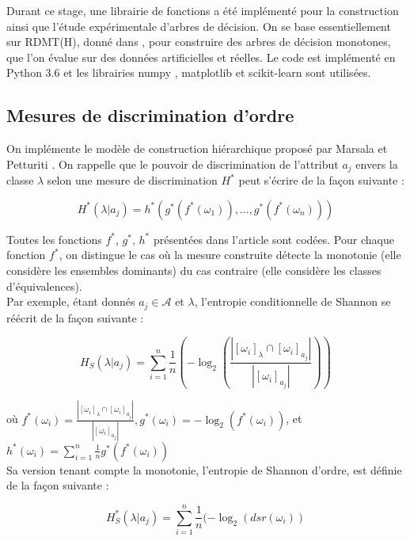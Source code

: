 \documentclass[a4paper]{article}
\begin{document}
Durant ce stage, une librairie de fonctions a été implémenté pour la construction
ainsi que l'étude expérimentale d'arbres de décision.  On se base
essentiellement sur RDMT(H), donné dans \cite{marsala-rank}, pour construire des
arbres de décision monotones, que l'on évalue sur des données artificielles et
réelles. Le code est implémenté en Python 3.6 et les librairies numpy
\cite{walt-numpy}, matplotlib \cite{hunter-matplotlib} et scikit-learn
\cite{scikit-learn} sont utilisées.

\subsection{Mesures de discrimination d'ordre} 

On implémente le modèle de construction hiérarchique proposé par Marsala et
Petturiti \cite{marsala-rank}. On rappelle que le pouvoir de discrimination de
l'attribut $a_j$ envers la classe $\lambda$ selon une mesure de discrimination
$H^*$ peut s'écrire de la façon suivante :

$$ H^*(\lambda | a_j) = h^*(g^*(f^*(\omega_1)),...,g^*(f^*(\omega_n)))$$

\noindent Toutes les fonctions $f^*$, $g^*$, $h^*$ présentées dans l'article
sont codées.  Pour chaque fonction $f^*$, on distingue le cas où la mesure
construite détecte la monotonie (elle considère les ensembles dominants) du
cas contraire (elle considère les classes d'équivalences). \\

Par exemple, étant donnés $a_j \in \mathcal{A}$ et $\lambda$, l'entropie
conditionnelle de Shannon se réécrit de la façon suivante :

\begin{equation}
    H_S(\lambda | a_j) = \sum_{i=1}^{n} \frac{1}{n} (-\log_{2}
    (\frac{|[\omega_i]_{\lambda} \cap [\omega_i]_{a_j}|}{|[\omega_i]_{a_j}|}))
\label{eq:shannon}
\end{equation}


où $f^*(\omega_i) = \frac{|[\omega_i]_{\lambda} \cap
[\omega_i]_{a_j}|}{|[\omega_i]_{a_j}|}, g^*(\omega_i) = -\log_{2}
(f^*(\omega_i))$, et $h^*(\omega_i) = \sum_{i=1}^{n} \frac{1}{n}
g^*(f^*(\omega_i))$ \\

Sa version tenant compte la monotonie, l'entropie de Shannon d'ordre, est
définie de la façon suivante :

$$ H^*_S(\lambda | a_j) = \sum_{i=1}^{n} \frac{1}{n} (-\log_{2} (dsr(\omega_i))$$
\end{document}
